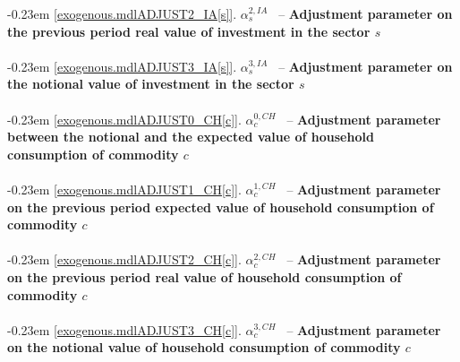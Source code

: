 \documentclass[12pt]{article}
\numberwithin{equation}{section}
\begin{document}
\noindent \kern-0.23em \noindent \begingroup {} \label{exogenous.mdlADJUST2_IA[s]}\ref{exogenous.mdlADJUST2_IA[s]}.
         
        \ensuremath{\alpha^{{2},IA}_{s}}~ \endgroup -- \noindent \textbf{Adjustment parameter on the previous period real value of investment in the sector $s$}  \\ \\[-8pt]


\noindent \kern-0.23em \noindent \begingroup {} \label{exogenous.mdlADJUST3_IA[s]}\ref{exogenous.mdlADJUST3_IA[s]}.
         
        \ensuremath{\alpha^{{3},IA}_{s}}~ \endgroup -- \noindent \textbf{Adjustment parameter on the notional value of investment in the sector $s$}  \\ \\[-8pt]


\noindent \kern-0.23em \noindent \begingroup {} \label{exogenous.mdlADJUST0_CH[c]}\ref{exogenous.mdlADJUST0_CH[c]}.
         
        \ensuremath{\alpha^{{0},CH}_{c}}~ \endgroup -- \noindent \textbf{Adjustment parameter between the notional and the expected value of household consumption of commodity $c$}  \\ \\[-8pt]


\noindent \kern-0.23em \noindent \begingroup {} \label{exogenous.mdlADJUST1_CH[c]}\ref{exogenous.mdlADJUST1_CH[c]}.
         
        \ensuremath{\alpha^{{1},CH}_{c}}~ \endgroup -- \noindent \textbf{Adjustment parameter on the previous period expected value of household consumption of commodity $c$}  \\ \\[-8pt]


\noindent \kern-0.23em \noindent \begingroup {} \label{exogenous.mdlADJUST2_CH[c]}\ref{exogenous.mdlADJUST2_CH[c]}.
         
        \ensuremath{\alpha^{{2},CH}_{c}}~ \endgroup -- \noindent \textbf{Adjustment parameter on the previous period real value of household consumption of commodity $c$}  \\ \\[-8pt]


\noindent \kern-0.23em \noindent \begingroup {} \label{exogenous.mdlADJUST3_CH[c]}\ref{exogenous.mdlADJUST3_CH[c]}.
         
        \ensuremath{\alpha^{{3},CH}_{c}}~ \endgroup -- \noindent \textbf{Adjustment parameter on the notional value of household consumption of commodity $c$}  \\ \\[-8pt]
\end{document}
